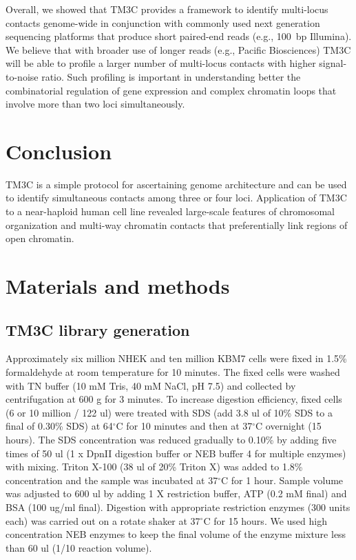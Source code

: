 Overall, we showed that TM3C provides a framework to identify multi-locus
contacts genome-wide in conjunction with commonly used next generation sequencing
platforms that produce short paired-end reads (e.g., 100~bp Illumina).
We believe that with broader use of longer reads (e.g., Pacific Biosciences)
TM3C will be able to profile a larger number of multi-locus contacts
with higher signal-to-noise ratio. Such profiling is important in
understanding better the combinatorial regulation of gene expression
and complex chromatin loops that involve more than
two loci simultaneously.

\section*{Conclusion}

TM3C is a simple protocol for ascertaining genome architecture and can
be used to identify simultaneous contacts among three or four
loci. Application of TM3C to a near-haploid human cell line revealed
large-scale features of chromosomal organization and multi-way
chromatin contacts that preferentially link regions of open chromatin.

\section*{Materials and methods}
\subsection*{TM3C library generation}
Approximately six million NHEK and ten million KBM7 cells were fixed in 1.5\% formaldehyde at
room temperature for 10 minutes. The fixed cells were washed with TN buffer (10 mM Tris, 40
mM NaCl, pH 7.5) and collected by centrifugation at 600 g for 3 minutes. To
increase digestion efficiency, fixed cells (6 or 10 million / 122 ul) were
treated with SDS (add 3.8 ul of 10\% SDS to a final of 0.30\% SDS) at
64$^{\circ}\mathrm{C}$ for 10 minutes and then at 37$^{\circ}\mathrm{C}$
overnight (15 hours). The SDS concentration was reduced gradually to 0.10\% by
adding five times of 50 ul (1 x DpnII digestion buffer or NEB buffer 4 for
multiple enzymes) with mixing. Triton X-100 (38 ul of 20\% Triton X) was added
to 1.8\% concentration and the sample was incubated at 37$^{\circ}\mathrm{C}$
for 1 hour. Sample volume was adjusted to 600 ul by adding 1 X restriction
buffer, ATP (0.2 mM final) and BSA (100 ug/ml final). Digestion with
appropriate restriction enzymes (300 units each) was carried out on a rotate
shaker at 37$^{\circ}\mathrm{C}$ for 15 hours. We used high concentration NEB
enzymes to keep the final volume of the enzyme mixture less than 60 ul (1/10
reaction volume).

